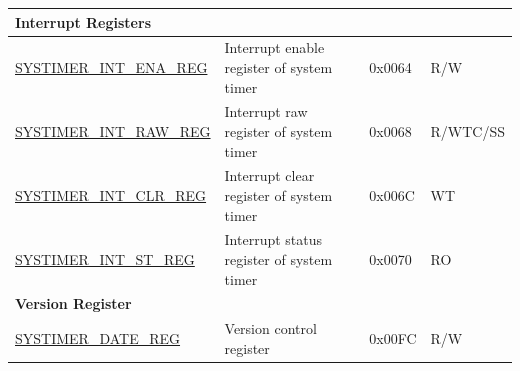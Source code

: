 \begin{longtable}{ | p{5.5cm} | p{7.0cm} | p{1.3cm} | p{1.7cm} | }
\multicolumn{4}{|l|}{\textbf{Interrupt Registers}} \\ \hline
\hyperref[regdesc:SYSTIMERINTENAREG]{SYSTIMER\_INT\_ENA\_REG} & Interrupt enable register of system timer & 0x0064 & R/W \\ \hline
\hyperref[regdesc:SYSTIMERINTRAWREG]{SYSTIMER\_INT\_RAW\_REG} & Interrupt raw register of system timer & 0x0068 & R/WTC/SS \\ \hline
\hyperref[regdesc:SYSTIMERINTCLRREG]{SYSTIMER\_INT\_CLR\_REG} & Interrupt clear register of system timer & 0x006C & WT \\ \hline
\hyperref[regdesc:SYSTIMERINTSTREG]{SYSTIMER\_INT\_ST\_REG} & Interrupt status register of system timer & 0x0070 & RO \\ \hline
\multicolumn{4}{|l|}{\textbf{Version Register}} \\ \hline
\hyperref[regdesc:SYSTIMERDATEREG]{SYSTIMER\_DATE\_REG} & Version control register & 0x00FC & R/W \\ \hline
\end{longtable}
